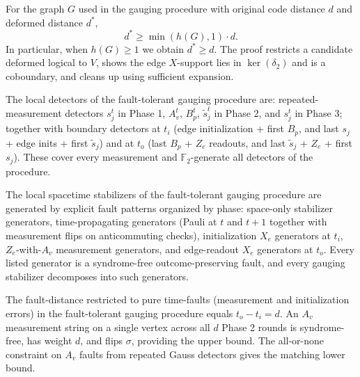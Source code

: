 \begin{lemma}
\label{lem:3_space_distance}
\leanok
For the graph $G$ used in the gauging procedure with original code distance $d$ and deformed
distance $d^*$,
\[
  d^* \ge \min(h(G), 1) \cdot d.
\]
In particular, when $h(G) \ge 1$ we obtain $d^* \ge d$. The proof restricts a candidate
deformed logical to $V$, shows the edge $X$-support lies in $\ker(\delta_2)$ and is a
coboundary, and cleans up using sufficient expansion.
\end{lemma}

\begin{lemma}
\label{lem:4_spacetime_code_detectors}
\leanok
The local detectors of the fault-tolerant gauging procedure are: repeated-measurement
detectors $s_j^t$ in Phase 1, $A_v^t$, $B_p^t$, $\tilde s_j^t$ in Phase 2, and $s_j^t$ in
Phase 3; together with boundary detectors at $t_i$ (edge initialization + first $B_p$, and
last $s_j$ + edge inits + first $\tilde s_j$) and at $t_o$ (last $B_p$ + $Z_e$ readouts, and
last $\tilde s_j$ + $Z_e$ + first $s_j$). These cover every measurement and $\mathbb{F}_2$-generate
all detectors of the procedure.
\end{lemma}

\begin{lemma}
\label{lem:5_spacetime_stabilizers}
\leanok
The local spacetime stabilizers of the fault-tolerant gauging procedure are generated by
explicit fault patterns organized by phase: space-only stabilizer generators, time-propagating
generators (Pauli at $t$ and $t+1$ together with measurement flips on anticommuting checks),
initialization $X_e$ generators at $t_i$, $Z_e$-with-$A_v$ measurement generators, and
edge-readout $X_e$ generators at $t_o$. Every listed generator is a syndrome-free
outcome-preserving fault, and every gauging stabilizer decomposes into such generators.
\end{lemma}

\begin{lemma}
\label{lem:6_time_fault_distance}
\leanok
The fault-distance restricted to pure time-faults (measurement and initialization errors)
in the fault-tolerant gauging procedure equals $t_o - t_i = d$. An $A_v$ measurement string
on a single vertex across all $d$ Phase 2 rounds is syndrome-free, has weight $d$, and flips
$\sigma$, providing the upper bound. The all-or-none constraint on $A_v$ faults from
repeated Gauss detectors gives the matching lower bound.
\end{lemma}

